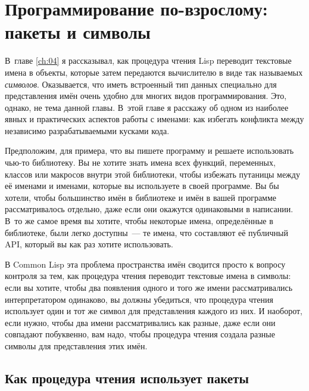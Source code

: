 \chapter{Программирование по-взрослому: пакеты и символы}
\label{ch:21}

\thispagestyle{empty}

В~главе \ref{ch:04} я рассказывал, как процедура чтения Lisp переводит текстовые имена в
объекты, которые затем передаются вычислителю в виде так называемых \textit{символов}.
Оказывается, что иметь встроенный тип данных специально для представления имён очень
удобно для многих видов программирования. Это, однако, не тема
данной главы. В~этой главе я расскажу об одном из наиболее явных и практических аспектов
работы с именами: как избегать конфликта между независимо разрабатываемыми кусками кода.

Предположим, для примера, что вы пишете программу и решаете использовать чью-то
библиотеку.  Вы не хотите знать имена всех функций, переменных, классов или макросов
внутри этой библиотеки, чтобы избежать путаницы между её именами и именами, которые вы
используете в своей программе. Вы бы хотели, чтобы большинство имён в библиотеке и имён в
вашей программе рассматривалось отдельно, даже если они окажутся одинаковыми в написании.
В~то же самое время вы хотите, чтобы некоторые имена, определённые в библиотеке, были
легко доступны~--- те имена, что составляют её публичный API, который вы как раз хотите
использовать.

В Common Lisp эта проблема пространства имён сводится просто к вопросу конт\-ро\-ля за тем,
как процедура чтения переводит текстовые имена в символы: если вы хотите, чтобы два появления
одного и того же имени рассматривались интерпретатором одинаково, вы должны убедиться, что
процедура чтения использует один и тот же символ для представления каждого из них. И наоборот,
если нужно, чтобы два имени рассматривались как разные, даже если они совпадают
побуквенно, вам надо, чтобы процедура чтения создала разные символы для представления этих имён.

\section{Как процедура чтения использует пакеты}

